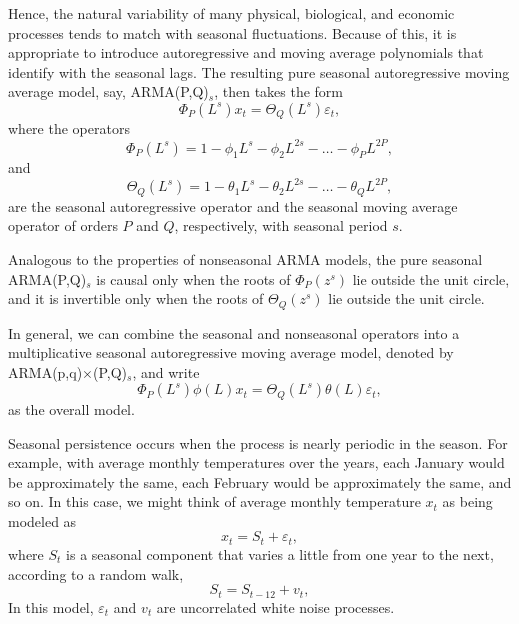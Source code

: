 \documentclass[
paper=128mm:96mm, %
fontsize=9.5pt, %
pagesize, %
parskip=half-, %
]{scrartcl} %
\theoremstyle{mythmstyle} %
\begin{document}
Hence, the natural variability of many physical, biological, and economic processes tends to match with seasonal fluctuations. Because of this, it is appropriate to introduce autoregressive and moving average polynomials that identify with the seasonal lags. The resulting pure seasonal autoregressive moving average model, say, ARMA(P,Q)$_s$, then takes the form
%
\begin{equation}
\Phi_P(L^s)x_t=\Theta_Q(L^s)\varepsilon_t,\nonumber
\end{equation}
%
where the operators
%
\begin{equation}
\Phi_P(L^s)=1-\phi_1L^s-\phi_2L^{2s}-\dots-\phi_PL^{2P},\nonumber
\end{equation}
%
and
%
\begin{equation}
\Theta_Q(L^s)=1-\theta_1L^s-\theta_2L^{2s}-\dots-\theta_QL^{2P},\nonumber
\end{equation}
%
are the seasonal autoregressive operator and the seasonal moving average operator of orders $P$ and $Q$, respectively, with seasonal period $s$.

Analogous to the properties of nonseasonal ARMA models, the pure seasonal ARMA(P,Q)$_s$ is causal only when the roots of $\Phi_P(z^s)$ lie outside the unit circle, and it is invertible only when the roots of $\Theta_Q(z^s)$ lie outside the unit circle.
\clearpage


In general, we can combine the seasonal and nonseasonal operators into a multiplicative seasonal autoregressive moving average model, denoted by ARMA(p,q)$\times$(P,Q)$_s$, and write
%
\begin{equation}
\Phi_P(L^s)\phi(L)x_t=\Theta_Q(L^s)\theta(L)\varepsilon_t,\nonumber
\end{equation}
%
as the overall model. 

Seasonal persistence occurs when the process is nearly periodic in the season. For example, with average monthly temperatures over the years, each January would be approximately the same, each February would be approximately the same, and so on. In this case, we might think of average monthly temperature $x_t$ as being modeled as
%
\begin{equation}
x_t=S_t+\varepsilon_t,\nonumber
\end{equation}
%
where $S_t$ is a seasonal component that varies a little from one year to the next, according to a random walk,
%
\begin{equation}
S_t=S_{t-12}+v_t,\nonumber
\end{equation}
%
In this model, $\varepsilon_t$ and $v_t$ are uncorrelated white noise processes.
\clearpage
\end{document}
